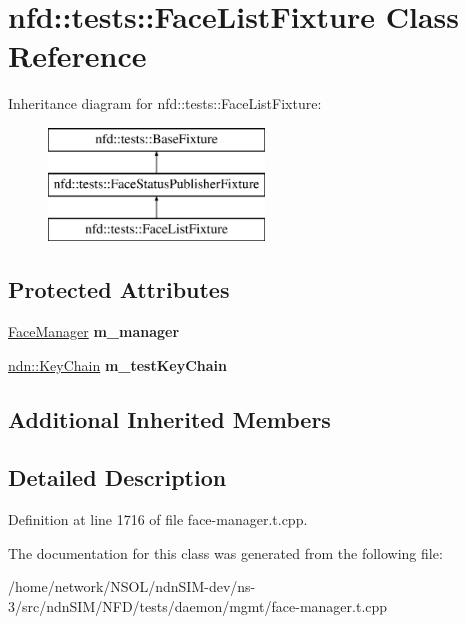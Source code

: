 \hypertarget{classnfd_1_1tests_1_1FaceListFixture}{}\section{nfd\+:\+:tests\+:\+:Face\+List\+Fixture Class Reference}
\label{classnfd_1_1tests_1_1FaceListFixture}
Inheritance diagram for nfd\+:\+:tests\+:\+:Face\+List\+Fixture\+:\begin{figure}[H]
\begin{center}
\leavevmode
\includegraphics[height=3.000000cm]{classnfd_1_1tests_1_1FaceListFixture}
\end{center}
\end{figure}
\subsection*{Protected Attributes}
\begin{DoxyCompactItemize}
\item 
\hyperlink{classnfd_1_1FaceManager}{Face\+Manager} {\bfseries m\+\_\+manager}\hypertarget{classnfd_1_1tests_1_1FaceListFixture_a580c6d7adc864d606dc950b8a7924253}{}\label{classnfd_1_1tests_1_1FaceListFixture_a580c6d7adc864d606dc950b8a7924253}

\item 
\hyperlink{classndn_1_1security_1_1KeyChain}{ndn\+::\+Key\+Chain} {\bfseries m\+\_\+test\+Key\+Chain}\hypertarget{classnfd_1_1tests_1_1FaceListFixture_abecf813305572307c23a41496ff23f27}{}\label{classnfd_1_1tests_1_1FaceListFixture_abecf813305572307c23a41496ff23f27}

\end{DoxyCompactItemize}
\subsection*{Additional Inherited Members}


\subsection{Detailed Description}


Definition at line 1716 of file face-\/manager.\+t.\+cpp.



The documentation for this class was generated from the following file\+:\begin{DoxyCompactItemize}
\item 
/home/network/\+N\+S\+O\+L/ndn\+S\+I\+M-\/dev/ns-\/3/src/ndn\+S\+I\+M/\+N\+F\+D/tests/daemon/mgmt/face-\/manager.\+t.\+cpp\end{DoxyCompactItemize}

